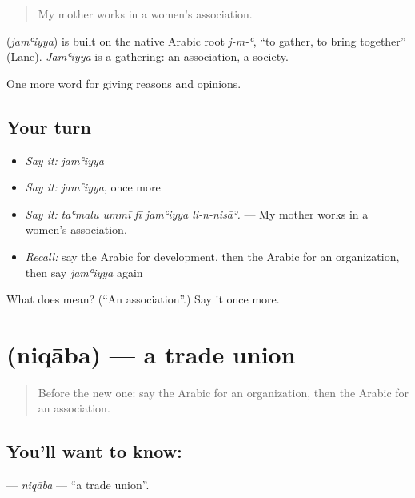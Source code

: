 \begin{quote}
My mother works in a women's association.
\end{quote}

\begin{cousinweb}
\textbf{} (\emph{jamʿiyya}) is built on the native Arabic root \emph{j-m-ʿ}, \textquotedblleft{}to gather, to bring together\textquotedblright{} (Lane). \emph{Jamʿiyya} is a gathering: an association, a society.
\end{cousinweb}

\begin{grammarlens}[title={What you've built}]
One more word for giving reasons and opinions.
\end{grammarlens}

\subsection*{Your turn}
\begin{itemize}
\raggedright
  \item \emph{Say it:} \emph{jamʿiyya}
  \item \emph{Say it:} \emph{jamʿiyya}, once more
  \item \emph{Say it:} \emph{taʿmalu ummī fī jamʿiyya li-n-nisāʾ.} — My mother works in a women's association.
  \item \emph{Recall:} say the Arabic for development, then the Arabic for an organization, then say \emph{jamʿiyya} again
\end{itemize}

\begin{tcolorbox}[breakable,colback=teal!4,colframe=teal!35!black,title={Before you move on}]
What does  mean? (\textquotedblleft{}An association\textquotedblright{}.) Say it once more.
\end{tcolorbox}
\section[\texorpdfstring{\ar{نقابة} (niqāba)}{نقابة (niqāba)}]{ (niqāba) — a trade union}

\label{lesson:AR-C385-niqaba}



\begin{quote}
Before the new one: say the Arabic for an organization, then the Arabic for an association.
\end{quote}

\subsection*{You'll want to know: }
\textbf{} — \emph{niqāba} — \textquotedblleft{}a trade union\textquotedblright{}.

